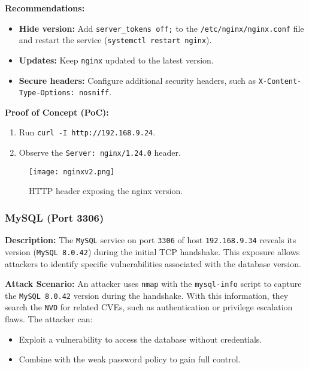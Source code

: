 \documentclass[a4paper,12pt]{article}
\begin{document}
\textbf{Recommendations:}  
\begin{itemize}
    \item \textbf{Hide version:} Add \texttt{server\_tokens off;} to the \texttt{/etc/nginx/nginx.conf} file and restart the service (\texttt{systemctl restart nginx}).  
    \item \textbf{Updates:} Keep \texttt{nginx} updated to the latest version.  
    \item \textbf{Secure headers:} Configure additional security headers, such as \texttt{X-Content-Type-Options: nosniff}.  
\end{itemize}

\textbf{Proof of Concept (PoC):}  
\begin{enumerate}
    \item Run \texttt{curl -I http://192.168.9.24}.  
    \item Observe the \texttt{Server: nginx/1.24.0} header.  
\end{enumerate}

\begin{figure}[ht]
    \centering
    \texttt{[image: nginxv2.png]}
    \caption{HTTP header exposing the nginx version.}
\end{figure}

\clearpage

\subsubsection{MySQL (Port 3306)}
\textbf{Description:}  
The \texttt{MySQL} service on port \texttt{3306} of host \texttt{192.168.9.34} reveals its version (\texttt{MySQL 8.0.42}) during the initial TCP handshake. This exposure allows attackers to identify specific vulnerabilities associated with the database version.

\textbf{Attack Scenario:}  
An attacker uses \texttt{nmap} with the \texttt{mysql-info} script to capture the \texttt{MySQL 8.0.42} version during the handshake. With this information, they search the \texttt{NVD} for related CVEs, such as authentication or privilege escalation flaws. The attacker can:  
\begin{itemize}
    \item Exploit a vulnerability to access the database without credentials.  
    \item Combine with the weak password policy to gain full control.  
\end{itemize}
\end{document}
